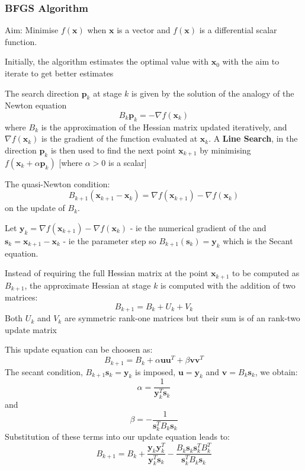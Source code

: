 \documentclass{article}
\begin{document}
\subsubsection{BFGS Algorithm}
    Aim: Minimise $f(\textbf{x})$ when $\textbf{x}$ is a vector and $f(\textbf{x})$ is a differential  scalar function. 

    Initially, the algorithm estimates the optimal value with $\textbf{x}_0$ with the aim to iterate to get better estimates

    The search direction $\textbf{p}_k$ at stage $k$ is given by the solution of the analogy of the Newton equation
    \[ B_k\textbf{p}_k = - \nabla f(\textbf{x}_k) \]
    where $B_k$ is the approximation of the Hessian matrix updated iteratively, and $\nabla f(\textbf{x}_k)$ is the gradient of the function evaluated at $\textbf{x}_k$. A \textbf{Line Search}, in the direction $\textbf{p}_k$ is then used to find the next point $\textbf{x}_{k+1}$ by minimising $f(\textbf{x}_k + \alpha\textbf{p}_k)$ [where $\alpha \gt 0 $ is a scalar]

    The quasi-Newton condition:
    \[ B_{k+1}(\textbf{x}_{k+1} - \textbf{x}_k) = \nabla f(\textbf{x}_{k+1}) - \nabla f(\textbf{x}_k) 
    \]
    on the update of $B_k$. 

    Let $\textbf{y}_k = \nabla f(\textbf{x}_{k+1}) - \nabla f(\textbf{x}_k) $ - ie  the numerical gradient of the 
    and $\textbf{s}_k = \textbf{x}_{k+1} - \textbf{x}_k $ 	- ie the parameter step
    so $B_{k+1}(\textbf{s}_k) = \textbf{y}_k$ which is the Secant equation.

    Instead of requiring the full Hessian matrix at the point $\textbf{x}_{k+1}$ to be computed as $B_{k+1}$, the approximate Hessian at stage $k$ is computed with the addition of two matrices:
    \[B_{k+1} = B_k + U_k + V_k \]
    Both $U_k$ and $V_k$ are symmetric rank-one matrices but their sum is of an rank-two update matrix

    This update equation can be choosen as:
    \[
    B_{k+1} = B_k + \alpha \textbf{u}\textbf{u}^T + \beta\textbf{v}\textbf{v}^T
    \]
    The secant condition, $B_{k+1} \textbf{s}_k = \textbf{y}_k$ is imposed, $\textbf{u} = \textbf{y}_k$ and $\textbf{v} = B_k \textbf{s}_k$, we obtain: \[\alpha = \frac{1}{\textbf{y}_k^T \textbf{s}_k}\]
    and \[\beta = - \frac{1}{\textbf{s}_k^T B_k \textbf{s}_k}\] 
    Substitution of these terms into our update equation leads to:
    \[
    B_{k+1} = B_k + \frac{\textbf{y}_k \textbf{y}_k^T}{\textbf{y}_k^T \textbf{s}_k} - \frac{B_k \textbf{s}_k \textbf{s}_k^T B_k^T}{\textbf{s}_k^T B_k \textbf{s}_k}
    \]
\end{document}
